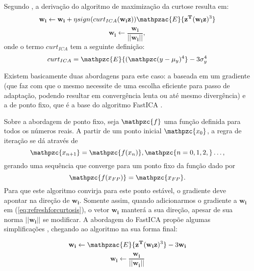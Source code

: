     Segundo \cite{LuizVictorio}, a derivação do algoritmo de maximização da curtose resulta em:
    \begin{equation}
        \mathbf{w_i} \leftarrow \mathbf{w_i} + \eta  sign(curt_{ICA}(\mathbf{w_iz}))\mathpzac{E}\{\mathbf{z^T}(\mathbf{w_iz})^3\}
        \label{eq:refreshforcurtosis}
    \end{equation}
    \begin{equation}
        \mathbf{w_i} \leftarrow \frac{\mathbf{w_i}}{|| \mathbf{w_i}||},
    \end{equation}
    onde o termo $curt_{ICA}$ tem a seguinte definição:
    \begin{equation}
        curt_{ICA} = \mathpzc{E}\{(\mathpzc(y - \mu_y)^4\} -3\sigma_y^4
    \end{equation}

    Existem basicamente duas abordagens para este caso: a baseada em um gradiente (que faz com que o mesmo necessite de uma escolha eficiente para passo de adaptação, podendo resultar em convergência lenta ou até mesmo divergência) e a de ponto fixo, que é a base do algoritmo FastICA \cite{fastica1}. 
    
    Sobre a abordagem de ponto fixo, seja $\mathpzc{f}$ uma função definida para todos os números reais. A partir de um ponto inicial $\mathpzc{x_0}$, a regra de iteração se dá através de 
    \begin{equation}
        \mathpzc{x_{n+1}} = \mathpzc{f(x_n)}, \mathpzc{n = 0,1,2,}\dots,
    \end{equation}
    gerando uma sequência que converge para um ponto fixo da função dado por
    \begin{equation}
        \mathpzc{f(x_{FP})} = \mathpzc{x_{FP}}.
    \end{equation}
    Para que este algoritmo convirja para este ponto estável, o gradiente deve apontar na direção de $\mathbf{w_i}$. Somente assim, quando adicionarmos o gradiente a $\mathbf{w_i}$ em (\ref{eq:refreshforcurtosis}), o vetor $\mathbf{w_i}$ manterá a sua direção, apesar de sua norma $\mathbf{||w_i||}$ se modificar. A abordagem do FastICA propõe algumas simplificações \cite{fastica1}, chegando ao algoritmo na sua forma final:
    
    \begin{equation}
        \mathbf{w_i} \leftarrow \mathpzac{E}\{\mathbf{z^T}(\mathbf{w_iz})^3\} - 3\mathbf{w_i}
        \label{eq:ICAcurtosis}
    \end{equation}
     \begin{equation}
        \mathbf{w_i} \leftarrow \frac{\mathbf{w_i}}{||\mathbf{w_i}||}
        \label{eq:ICAcurtosismodulate}
    \end{equation}


